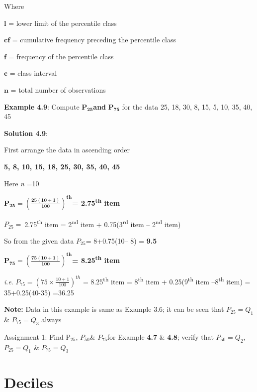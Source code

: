 \documentclass[
]{book}
\begin{document}
Where

\(\mathbf{l}\) = lower limit of the percentile class

\(\mathbf{\text{cf}}\) = cumulative frequency preceding the percentile
class

\(\mathbf{f}\) = frequency of the percentile class

\(\mathbf{c}\) = class interval

\(\mathbf{n}\) = total number of observations

\textbf{Example 4.9}: Compute \(\mathbf{P}_{\mathbf{25}}\)\textbf{and}
\(\mathbf{P}_{\mathbf{75}}\) for the data 25, 18, 30, 8, 15, 5, 10, 35,
40, 45

\textbf{Solution 4.9}:

First arrange the data in ascending order

\textbf{5, 8, 10, 15, 18, 25, 30, 35, 40, 45}

Here \emph{n} =10

\(\mathbf{P}_{\mathbf{25}}\mathbf{=}\left( \frac{\mathbf{25}\left( \mathbf{10 + 1} \right)}{\mathbf{100}} \right)^{\mathbf{\text{th}}}\)\textbf{=
2.75\textsuperscript{th} item}

\(P_{25} = \ \)2.75\textsuperscript{th} item = 2\textsuperscript{nd} item + 0.75(3\textsuperscript{rd}
item -- 2\textsuperscript{nd} item)

So from the given data \(P_{25}\)= 8+0.75(10-- 8) = \textbf{9.5}

\(\mathbf{P}_{\mathbf{75}}\mathbf{=}\left( \frac{\mathbf{75}\left( \mathbf{10 + 1} \right)}{\mathbf{100}} \right)^{\mathbf{\text{th}}}\)\textbf{=
8.25\textsuperscript{th} item}

\emph{i}.\emph{e}. \(P_{75} = \left( 75 \times \frac{10 + 1}{100} \right)^{th}\) =
8.25\textsuperscript{th} item = 8\textsuperscript{th} item + 0.25(9\textsuperscript{th} item --8\textsuperscript{th} item) =
35+0.25(40-35) =36.25

\textbf{Note:} Data in this example is same as Example 3.6; it can be seen
that \(P_{25} = Q_{1}\) \& \(P_{75} = Q_{3}\) always

\begin{rmdnote}
Assignment 1: Find \(\text{P}_{25}\), \(P_{50}\)\& \(P_{75}\)for Example
\textbf{4.7} \& \textbf{4.8}; verify that \(P_{50} = Q_{2}\), \(P_{25} = Q_{1}\) \&
\(P_{75} = Q_{3}\)
\end{rmdnote}

\hypertarget{deciles}{%
\section{Deciles}\label{deciles}}
\end{document}
